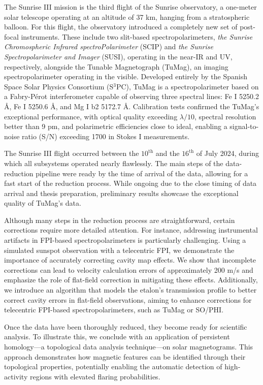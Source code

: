 \documentclass[12pt]{mythesis}
\begin{document}
The Sunrise III mission is the third flight of the Sunrise observatory, a one-meter solar telescope operating at an altitude of 37 km, hanging from a stratospheric balloon. For this flight, the observatory introduced a completely new set of post-focal instruments. These include two slit-based spectropolarimeters, \textit{the Sunrise Chromospheric Infrared spectroPolarimeter} (SCIP) and \textit{the Sunrise Spectropolarimeter and Imager} (SUSI), operating in the near-IR and UV, respectively, alongside the Tunable Magnetograph (TuMag), an imaging spectropolarimeter operating in the visible. Developed entirely by the Spanish Space Solar Physics Consortium (S$^3$PC), TuMag is a spectropolarimeter based on a Fabry-Pérot interferometer capable of observing three spectral lines: Fe I 5250.2 Å, Fe I 5250.6 Å, and Mg I b2 5172.7 Å. Calibration tests confirmed the TuMag’s exceptional performance, with optical quality exceeding $\lambda/10$, spectral resolution better than 9 pm, and polarimetric efficiencies close to ideal, enabling a signal-to-noise ratio (S/N) exceeding 1700 in Stokes I measurements.

The Sunrise III flight occurred between the $10^{\text{th}}$ and the $16^{\text{th}}$ of July 2024, during which all subsystems operated nearly flawlessly. The main steps of the data-reduction pipeline were ready by the time of arrival of the data, allowing for a fast start of the reduction process. While ongoing due to the close timing of data arrival and thesis preparation, preliminary results showcase the exceptional quality of TuMag’s data.

Although many steps in the reduction process are straightforward, certain corrections require more detailed attention. For instance, addressing instrumental artifacts in FPI-based spectropolarimeters is particularly challenging. Using a simulated sunspot observation with a telecentric FPI, we demonstrate the importance of accurately correcting cavity map effects. We show that incomplete corrections can lead to velocity calculation errors of approximately 200 m/s and emphasize the role of flat-field correction in mitigating these effects. Additionally, we introduce an algorithm that models the etalon's transmission profile to better correct cavity errors in flat-field observations, aiming to enhance corrections for telecentric FPI-based spectropolarimeters, such as TuMag or SO/PHI.

Once the data have been thoroughly reduced, they become ready for scientific analysis. To illustrate this, we conclude with an application of persistent homology—a topological data analysis technique—on solar magnetograms. This approach demonstrates how magnetic features can be identified through their topological properties, potentially enabling the automatic detection of high-activity regions with elevated flaring probabilities.
\end{document}

